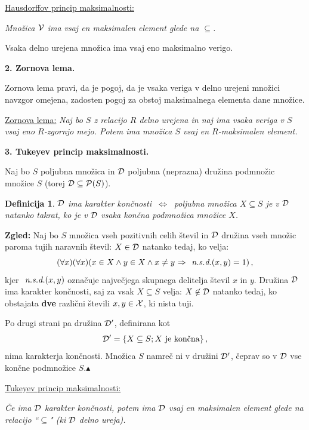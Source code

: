 \documentclass[11pt,paper=b5,footinclude,headinclude]{scrbook} %
\def\sledi {{~\Rightarrow~}}
\def\cee {{~\Leftrightarrow~}}
\def\zgled{\noindent\textbf{\color{blue} Zgled: }}
\def\kz{{\hfill{\color{blue}$\blacktriangle$}}}%
\newtheorem*{definicija}{Definicija}
\begin{document}
\bigskip
\underline{Hausdorffov princip maksimalnosti:}

{\em Množica ${\cal V}$ ima vsaj en maksimalen element glede na $\subseteq$.}

Vsaka delno urejena množica ima vsaj eno maksimalno verigo.

\bigskip
\textbf{2. Zornova lema.}

Zornova lema pravi, da je pogoj, da je vsaka veriga v delno urejeni množici navzgor omejena,
zadosten pogoj za obstoj maksimalnega elementa dane množice.

\medskip
\underline{Zornova lema:} {\em Naj bo $S$ z relacijo $R$ delno urejena in naj ima vsaka veriga v $S$ vsaj eno
$R$-zgornjo mejo. Potem ima množica $S$ vsaj en $R$-maksimalen element.}

\bigskip
\bigskip
\textbf{3. Tukeyev princip maksimalnosti.}

Naj bo $S$ poljubna množica in ${\cal D}$ poljubna (neprazna) družina podmnožic množice $S$ (torej ${\cal D}\subseteq {\cal P}(S)$).

\begin{definicija}
${\cal D}$  ima {\em karakter končnosti} $\cee$ poljubna množica $X\subseteq S$ je v ${\cal D}$ natanko takrat, ko je v ${\cal D}$ vsaka {\em končna} podmnožica množice $X$.
\end{definicija}

\medskip
\zgled
Naj bo $S$ množica vseh pozitivnih celih števil in ${\cal D}$ družina vseh množic paroma tujih naravnih števil:
$X\in {\cal D}$ natanko tedaj, ko velja:
$$(\forall x)(\forall x)(x\in X \land y\in X\land x\neq y\sledi \emph{ n.s.d.}(x,y) = 1)\,,$$
kjer $\emph{ n.s.d.}(x,y)$ označuje največjega skupnega delitelja števil $x$ in $y$.
Družina ${\cal D}$ ima karakter končnosti, saj za vsak $X\subseteq S$ velja:
$X\not\in {\cal D}$ natanko tedaj, ko obstajata \textbf{dve} različni števili $x,y\in {\cal X}$,  ki nista tuji.

Po drugi strani pa družina ${\cal D}'$, definirana kot
$${\cal D}' = \{X\subseteq S; X \textrm{ je končna}\}\,,$$
nima karakterja končnosti. Množica $S$ namreč ni v družini ${\cal D}'$,
čeprav so v ${\cal D}$ vse končne podmnožice $S$.\kz

\bigskip
\underline{Tukeyev princip maksimalnosti:}

{\em Če ima ${\cal D}$ karakter končnosti, potem ima ${\cal D}$ vsaj en maksimalen element glede na relacijo ``$\subseteq$" (ki ${\cal D}$ delno ureja).}

\bigskip
\end{document}
